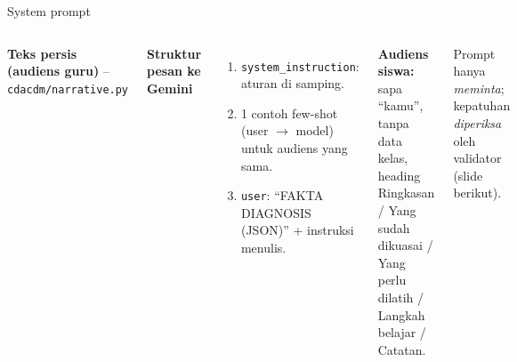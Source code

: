 \documentclass[aspectratio=169,10pt]{beamer}
\begin{document}
\begin{frame}[fragile]{System prompt}
  \begin{columns}[T]
    \footnotesize\textbf{Teks persis (audiens guru)} -- \texttt{cdacdm/narrative.py}
    
    \footnotesize
    \textbf{Struktur pesan ke Gemini}
    \begin{enumerate}
      \item \texttt{system\_instruction}: aturan di samping.
      \item 1 contoh few-shot (user $\to$ model) untuk audiens yang sama.
      \item \texttt{user}: ``FAKTA DIAGNOSIS (JSON)'' + instruksi menulis.
    \end{enumerate}
    \textbf{Audiens siswa:} sapa ``kamu'', tanpa data kelas, heading Ringkasan / Yang sudah dikuasai / Yang perlu
    dilatih / Langkah belajar / Catatan.
    \vspace{0.3em}
    \begin{infobox}
      Prompt hanya \emph{meminta}; kepatuhan \emph{diperiksa} oleh validator (slide berikut).
    \end{infobox}
  \end{columns}
\end{frame}
\end{document}
